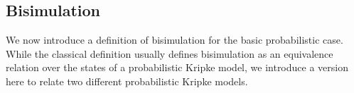 \subsection{Bisimulation}

  



    
    


We now introduce a definition of bisimulation for the basic probabilistic case. While the classical definition usually defines bisimulation as an equivalence relation over the states of a probabilistic Kripke model, we introduce a version here to relate two different probabilistic Kripke models.

